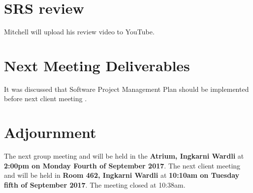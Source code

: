 \documentclass{article}
\begin{document}
\section{SRS review}
Mitchell will upload his review video to YouTube.

\section{Next Meeting Deliverables}
It was discussed that Software Project Management Plan should be implemented before next client meeting .

\section{Adjournment}
	The next group meeting and will be held in the {\bf Atrium, Ingkarni Wardli} at {\bf 2:00pm on Monday Fourth of September  2017}.
    \newline
    The next client meeting and will be held in {\bf Room 462, Ingkarni Wardli} at {\bf 10:10am on Tuesday fifth of September 2017}.
The meeting closed at 10:38am.
\end{document}
